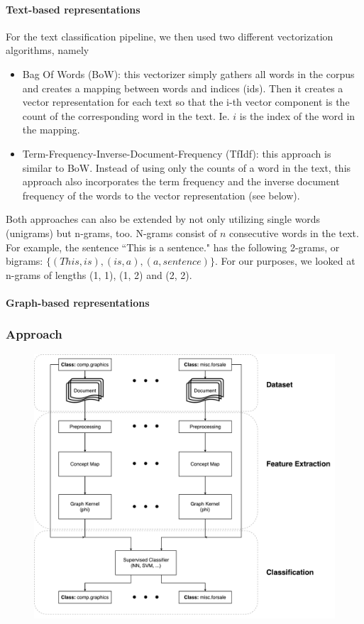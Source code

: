 
\paragraph{Text-based representations}
For the text classification pipeline, we then used two different vectorization algorithms, namely
\begin{itemize}
\item{Bag Of Words (BoW): this vectorizer simply gathers all words in the corpus and creates a mapping between words and indices (ids). Then it creates a vector representation for each text so that the i-th vector component  is the count of the corresponding word in the text. Ie. $i$ is the index of the word in the mapping.}
\item{Term-Frequency-Inverse-Document-Frequency (TfIdf): this approach is similar to BoW. Instead of using only the counts of a word in the text, this approach also incorporates the term frequency and the inverse document frequency of the words to the vector representation (see below).}
\end{itemize}
Both approaches can also be extended by not only utilizing single words (unigrams) but n-grams, too. N-grams consist of $n$ consecutive words in the text.
For example, the sentence ``This is a sentence." has the following 2-grams, or bigrams: $\{ (This, is), (is, a), (a, sentence) \}$.
For our purposes, we looked at n-grams of lengths (1, 1), (1, 2) and (2, 2).


\paragraph{Graph-based representations}


\subsubsection{Approach}

\begin{figure}[ht]
\centering\includegraphics[width=0.6\linewidth]{assets/figures/approach.pdf}
\caption{}
\end{figure}

